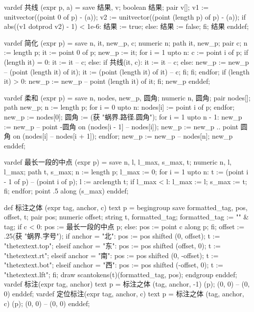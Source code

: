 \startMPinclusions[+]
vardef 共线 (expr p, a) =
  save 结果, v; boolean 结果; pair v[];
  v1 := unitvector((point 0 of p) - (a));
  v2 := unitvector((point (length p) of p) - (a));
  if abs((v1 dotprod v2) - 1) < 1e-6:
     结果 := true;
  else:
    结果 := false;
  fi;
  结果
enddef;

vardef 简化 (expr p) =
  save n, it, new_p, c;
  numeric n; path it, new_p; pair c;
  n := length p;
  it := point 0 of p;
  new_p := it;
  for i = 1 upto n:
    c := point i of p;
    if (length it) = 0: 
      it := it -- c;
    else:
      if 共线(it, c):
        it := it -- c;
      else:
        new_p := new_p -- (point (length it) of it);
        it := (point (length it) of it) -- c;
      fi;
    fi;
  endfor;
  if (length it) > 0:
    new_p := new_p -- point (length it) of it;
  fi;
  new_p
enddef;

vardef 柔和 (expr p) =
  save n, nodes, new_p, 圆角; 
  numeric n, 圆角; pair nodes[]; path new_p;
  n := length p;
  for i = 0 upto n:
    nodes[i] := point i of p;
  endfor;
  new_p := nodes[0];
  圆角 := (获 "蜗界.路径.圆角");
  for i = 1 upto n - 1:
    new_p := new_p -- point -圆角 on (nodes[i - 1] -- nodes[i]);
    new_p := new_p .. point 圆角 on (nodes[i] -- nodes[i + 1]);
  endfor;
  new_p := new_p -- nodes[n];
  new_p
enddef;
\stopMPinclusions

\startMPinclusions[+]
vardef 最长一段的中点 (expr p) =
  save n, l, l_max, s_max, t;
  numeric n, l, l_max; path t, s_max;
  n := length p;
  l_max := 0;
  for i = 1 upto n:
    t := (point i - 1 of p) -- (point i of p);
    l := arclength t;
    if l_max < l:
      l_max := l; s_max := t;
    fi;
  endfor;
  point .5 along (s_max)
enddef;

def 标注之体 (expr tag, anchor, c) text p =
  begingroup
    save formatted_tag, pos, offset, t;
    pair pos; numeric offset; string t, formatted_tag;
    formatted_tag := "\tfx" & tag;
    if c < 0:
      pos := 最长一段的中点 p;
    else:
      pos := point c along p;
    fi;
    offset := .25(获 "蜗界.字号");
    if anchor = "北":
      pos := pos shifted (0, offset);
      t := "thetextext.top";
    elseif anchor = "东":
      pos := pos shifted (offset, 0);
      t := "thetextext.rt";
    elseif anchor = "南":
      pos := pos shifted (0, -offset);
      t := "thetextext.bot";
    elseif anchor = "西":
      pos := pos shifted (-offset, 0);
      t := "thetextext.lft";
    fi;
    draw scantokens(t)(formatted_tag, pos);
  endgroup
enddef;
vardef 标注(expr tag, anchor) text p =
  标注之体 (tag, anchor, -1) (p);
  (0, 0) -- (0, 0)
enddef;
vardef 定位标注(expr tag, anchor, c) text p =
  标注之体 (tag, anchor, c) (p);
  (0, 0) -- (0, 0)
enddef;
\stopMPinclusions

